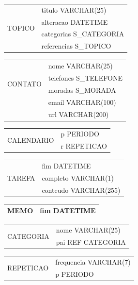 \documentclass[a4paper,12pt]{article}
\begin{document}
	\begin{multicols}{2}
		\begin{tabular}{|c|l|} \hline
		\multirow{4}{*}{TOPICO}
		& titulo VARCHAR(25) \\
		& alteracao DATETIME \\ 
		& categorias S\_CATEGORIA \\
		& referencias S\_TOPICO\\ \hline 
		\end{tabular}
		
		\begin{tabular}{|c|l|} \hline
		\multirow{4}{*}{CONTATO}
		& nome VARCHAR(25) \\
		& telefones S\_TELEFONE \\ 
		& moradas S\_MORADA \\
		& email VARCHAR(100) \\ 
		& url VARCHAR(200) \\ \hline 
		\end{tabular}
		
		\begin{tabular}{|c|l|} \hline
		\multirow{2}{*}{CALENDARIO}
		& p PERIODO \\
		& r REPETICAO \\ \hline 
		\end{tabular}
		
		\begin{tabular}{|c|l|} \hline
		\multirow{3}{*}{TAREFA}
		& fim DATETIME \\
		& completo VARCHAR(1) \\ 
		& conteudo VARCHAR(255) \\ \hline 
		\end{tabular}
		
		\begin{tabular}{|c|l|} \hline
		MEMO & fim DATETIME \\ \hline
		\end{tabular}
		
		\begin{tabular}{|c|l|} \hline
		\multirow{2}{*}{CATEGORIA}
		& nome VARCHAR(25) \\
		& pai REF CATEGORIA \\ \hline 
		\end{tabular}
		
		\begin{tabular}{|c|l|} \hline
		\multirow{2}{*}{REPETICAO}
		& frequencia VARCHAR(7) \\
		& p PERIODO \\ \hline 
		\end{tabular}
		

\end{multicols}
\end{document}
